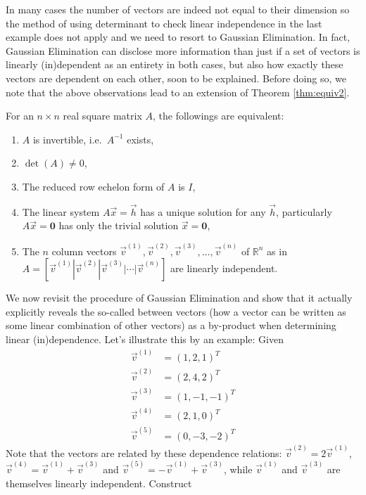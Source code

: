 In many cases the number of vectors are indeed not equal to their dimension so the method of using determinant to check linear independence in the last example does not apply and we need to resort to Gaussian Elimination. In fact, Gaussian Elimination can disclose more information than just if a set of vectors is linearly (in)dependent as an entirety in both cases, but also how exactly these vectors are dependent on each other, soon to be explained. Before doing so, we note that the above observations lead to an extension of Theorem \ref{thm:equiv2}.
\begin{thm}
\label{thm:equiv3}
For an $n \times n$ real square matrix $A$, the followings are equivalent:
\begin{enumerate}[label=(\alph*)]
\item $A$ is invertible, i.e.\ $A^{-1}$ exists,
\item $\det(A) \neq 0$,
\item The reduced row echelon form of $A$ is $I$,
\item The linear system $A\vec{x} = \vec{h}$ has a unique solution for any $\vec{h}$, particularly $A\vec{x} = \textbf{0}$ has only the trivial solution $\vec{x} = \textbf{0}$,
\item The $n$ column vectors $\vec{v}^{(1)}, \vec{v}^{(2)}, \vec{v}^{(3)}, \ldots, \vec{v}^{(n)}$ of $\mathbb{R}^n$ as in $A = [\vec{v}^{(1)}|\vec{v}^{(2)}|\vec{v}^{(3)}|\cdots|\vec{v}^{(n)}]$ are linearly independent.
\end{enumerate}
\end{thm}
We now revisit the procedure of Gaussian Elimination and show that it actually explicitly reveals the so-called  between vectors (how a vector can be written as some linear combination of other vectors) as a by-product when determining linear (in)dependence. Let's illustrate this by an example: Given
\begin{align*}
\vec{v}^{(1)} &= (1,2,1)^T \\
\vec{v}^{(2)} &= (2,4,2)^T \\
\vec{v}^{(3)} &= (1,-1,-1)^T \\
\vec{v}^{(4)} &= (2,1,0)^T \\
\vec{v}^{(5)} &= (0,-3,-2)^T
\end{align*}
Note that the vectors are related by these dependence relations: $\vec{v}^{(2)} = 2\vec{v}^{(1)}$, $\vec{v}^{(4)} = \vec{v}^{(1)} + \vec{v}^{(3)}$ and $\vec{v}^{(5)} = -\vec{v}^{(1)} + \vec{v}^{(3)}$, while $\vec{v}^{(1)}$ and $\vec{v}^{(3)}$ are  themselves linearly independent. Construct 
